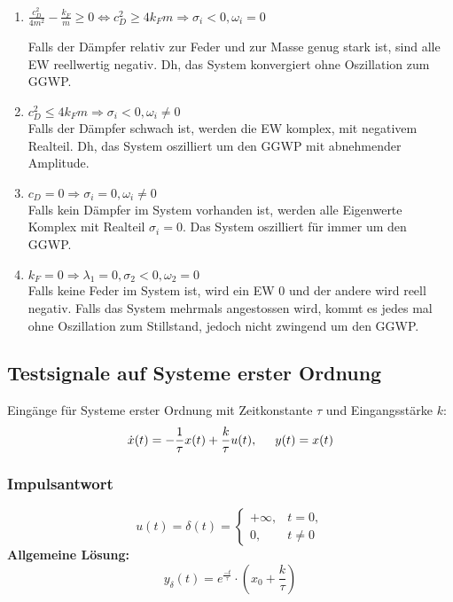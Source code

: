             \begin{enumerate}
                \item $\displaystyle \frac{c_D^2}{4m^2}-\frac{k_F}{m}\geqslant 0
                \Leftrightarrow c_D^2 \geqslant 4k_Fm \Rightarrow\boxed{\sigma_i<0,\omega_i=0}$
                
                Falls der Dämpfer relativ zur Feder und zur Masse genug stark ist, sind alle EW reellwertig negativ. Dh, das System konvergiert ohne Oszillation zum GGWP. 
                \item $\displaystyle c_D^2 \leqslant 4k_Fm \Rightarrow\boxed{\sigma_i<0,\omega_i\neq0}$
                \\Falls der Dämpfer schwach ist, werden die EW komplex, mit negativem Realteil. Dh, das System oszilliert um den GGWP mit abnehmender Amplitude. 
                \item $\displaystyle c_D=0 \Rightarrow\boxed{\sigma_i=0,\omega_i\neq0}$
                \\Falls kein Dämpfer im System vorhanden ist, werden alle Eigenwerte Komplex mit Realteil $\sigma_i=0$. Das System oszilliert für immer um den GGWP.
                \item $\displaystyle k_F=0 \Rightarrow\boxed{\lambda_1=0,\sigma_2<0,\omega_2=0}$
                \\Falls keine Feder im System ist, wird ein EW 0 und der andere wird reell negativ. Falls das System mehrmals angestossen wird, kommt es jedes mal ohne Oszillation zum Stillstand, jedoch nicht zwingend um den GGWP.

                
            \end{enumerate}
        
        \subsection{Testsignale auf Systeme erster Ordnung}
            Eingänge für Systeme erster Ordnung mit Zeitkonstante $\tau$ und Eingangsstärke $k$:
            \[\dot{x}(t) = -\frac{1}{\tau}x(t) + \frac{k}{\tau}u(t), \hspace{5mm} y(t) = x(t)\]
            \subsubsection{Impulsantwort}
                \[u(t) = \delta(t) = \begin{cases} +\infty, & t = 0, \\ 
                0, & t \neq 0 \end{cases}\]
                \textbf{Allgemeine Lösung:}
                \[y_{\delta}(t) = e^{\frac{-t}{\tau}}\cdot(x_0+\frac{k}{\tau})\]
        
